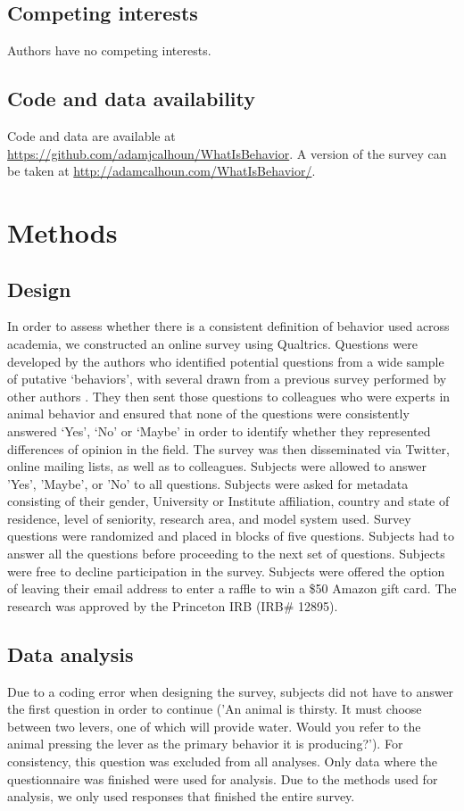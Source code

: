 \documentclass[a4paper, 11pt]{article}
\begin{document}
\subsection*{Competing interests}
Authors have no competing interests.

\subsection*{Code and data availability}
Code and data are available at \href{https://github.com/adamjcalhoun/WhatIsBehavior}{https://github.com/adamjcalhoun/WhatIsBehavior}. A version of the survey can be taken at \href{http://adamcalhoun.com/WhatIsBehavior/}{http://adamcalhoun.com/WhatIsBehavior/}.

\section*{Methods}
\subsection*{Design}
In order to assess whether there is a consistent definition of behavior used across academia, we constructed an online survey using Qualtrics. Questions were developed by the authors who identified potential questions from a wide sample of putative `behaviors', with several drawn from a previous survey performed by other authors \cite{levitis2009behavioural}. They then sent those questions to colleagues who were experts in animal behavior and ensured that none of the questions were consistently answered `Yes', `No' or `Maybe' in order to identify whether they represented differences of opinion in the field. The survey was then disseminated via Twitter, online mailing lists, as well as to colleagues. Subjects were allowed to answer 'Yes', 'Maybe', or 'No' to all questions. Subjects were asked for metadata consisting of their gender, University or Institute affiliation, country and state of residence, level of seniority, research area, and model system used. Survey questions were randomized and placed in blocks of five questions. Subjects had to answer all the questions before proceeding to the next set of questions. Subjects were free to decline participation in the survey. Subjects were offered the option of leaving their email address to enter a raffle to win a \$50 Amazon gift card. The research was approved by the Princeton IRB (IRB\# 12895).

\subsection*{Data analysis}
Due to a coding error when designing the survey, subjects did not have to answer the first question in order to continue ('An animal is thirsty. It must choose between two levers, one of which will provide water. Would you refer to the animal pressing the lever as the primary behavior it is producing?'). For consistency, this question was excluded from all analyses. Only data where the questionnaire was finished were used for analysis. Due to the methods used for analysis, we only used responses that finished the entire survey.
\end{document}
